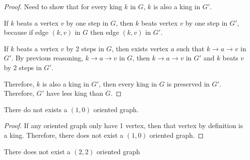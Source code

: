 \begin{proof}
  Need to show that for every king \(k\) in \(G\),
  \(k\) is also a king in \(G'\).

  If \(k\) beats a vertex \(v\) by one step in \(G\),
  then \(k\) beats vertex \(v\) by one step in \(G'\),
  because if edge \((k, v)\) in \(G\) then
  edge \((k, v)\) in \(G'\).

  If \(k\) beats a vertex \(v\) by 2 steps in \(G\),
  then exists vertex \(a\) such that
  \(k \to a \to v\) in \(G'\).
  By previous reasoning, \(k \to a \to v\) in \(G\),
  then \(k \to a \to v\) in \(G'\)
  and \(k\) beats \(v\) by 2 steps in \(G'\).

  Therefore, \(k\) is also a king in \(G'\),
  then every king in \(G\) is preserved in \(G'\).
  Therefore, \(G'\) have less king than \(G\).
\end{proof}

\begin{lemma}\label{the: no (1 0) oriented graph}
  There do not exists a \((1, 0)\) oriented graph.
\end{lemma}
\begin{proof}
  If any oriented graph only have 1 vertex,
  then that vertex by definition is a king.
  Therefore, there does not exist a \((1, 0)\) oriented graph.
\end{proof}

\begin{lemma}\label{the: no (2 2) oriented graph}
  There does not exist a \((2, 2)\) oriented graph
\end{lemma}

